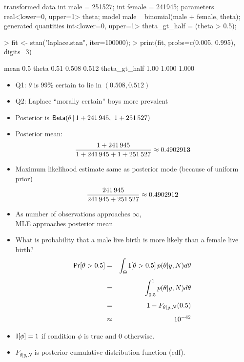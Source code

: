 \documentclass[10pt]{report}
\begin{document}
\begin{stancode}
transformed data {
  int male = 251527;
  int female = 241945;
}
parameters {
  real<lower=0, upper=1> theta;
}
model {
  male ~ binomial(male + female, theta);
}
generated quantities {
  int<lower=0, upper=1> theta_gt_half = (theta > 0.5);
}
\end{stancode}


%
\begin{codein}
> fit <- stan("laplace.stan", iter=100000);
> print(fit, probs=c(0.005, 0.995), digits=3)
\end{codein}
\begin{codeout}
                    mean   0.5%
theta               0.51  0.508  0.512
theta_gt_half       1.00  1.000  1.000
\end{codeout}
%
\begin{itemize}
\item Q1: $\theta$ is 99\% certain to lie in $(0.508, 0.512)$
%
\item Q2:  Laplace ``morally certain'' boys more prevalent
\end{itemize}


%
\begin{itemize}
\item Posterior is $\text{\sf Beta}(\theta \, | \, 1 + 241\,945, \ 1 + 251\,527)$
\item Posterior mean: 
\[
\frac{1 + 241\,945}
     {1 + 241\,945 + 1 + 251\,527}
\approx 0.490291{\bf3}
\]
\item Maximum likelihood estimate same as posterior mode (because
  of uniform prior) 
\[
\frac{241\,945}
     {241\,945 + 251\,527}
\approx 0.490291{\bf2}
\]
\item As number of observations approaches $\infty$, 
\\
MLE approaches posterior mean
\end{itemize}


%
\begin{itemize}
\item What is probability that a male live birth is more likely than a
  female live birth?
\begin{eqnarray*}
\text{\sf Pr}[\theta > 0.5] 
& = &  \int_{\Theta} \text{I}[\theta > 0.5] \, p(\theta|y,N) d\theta
\\[4pt]
& = &  \int_{0.5}^1 p(\theta|y,N) d\theta
\\[4pt]
& = &  1 - F_{\theta|y,N}(0.5)
\\[4pt]
& \approx &  10^{-42}
\end{eqnarray*}
\item $\text{I}[\phi] = 1$ if condition $\phi$ is true and 0 otherwise.
\item  $F_{\theta|y,N}$ is posterior cumulative distribution
function (cdf).
\end{itemize}
\end{document}
